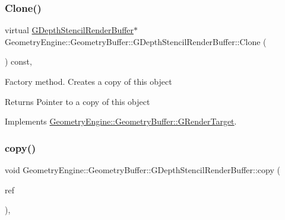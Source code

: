 \subsubsection{\texorpdfstring{Clone()}{Clone()}}
{\footnotesize\ttfamily virtual \mbox{\hyperlink{class_geometry_engine_1_1_geometry_buffer_1_1_g_depth_stencil_render_buffer}{G\+Depth\+Stencil\+Render\+Buffer}}$\ast$ Geometry\+Engine\+::\+Geometry\+Buffer\+::\+G\+Depth\+Stencil\+Render\+Buffer\+::\+Clone (\begin{DoxyParamCaption}{ }\end{DoxyParamCaption}) const\hspace{0.3cm}{\ttfamily [inline]}, {\ttfamily [virtual]}}

Factory method. Creates a copy of this object \begin{DoxyReturn}{Returns}
Pointer to a copy of this object 
\end{DoxyReturn}


Implements \mbox{\hyperlink{class_geometry_engine_1_1_geometry_buffer_1_1_g_render_target_a3b14d8929cf9d2acb6bc263c709ff019}{Geometry\+Engine\+::\+Geometry\+Buffer\+::\+G\+Render\+Target}}.

\mbox{\label{class_geometry_engine_1_1_geometry_buffer_1_1_g_depth_stencil_render_buffer_a85aeb8570c83b53e47c42fe1310bd5f1}} 
\subsubsection{\texorpdfstring{copy()}{copy()}}
{\footnotesize\ttfamily void Geometry\+Engine\+::\+Geometry\+Buffer\+::\+G\+Depth\+Stencil\+Render\+Buffer\+::copy (\begin{DoxyParamCaption}\item[{const \mbox{\hyperlink{class_geometry_engine_1_1_geometry_buffer_1_1_g_depth_stencil_render_buffer}{G\+Depth\+Stencil\+Render\+Buffer}} \&}]{ref }\end{DoxyParamCaption})\hspace{0.3cm}{\ttfamily [protected]}, {\ttfamily [virtual]}}

